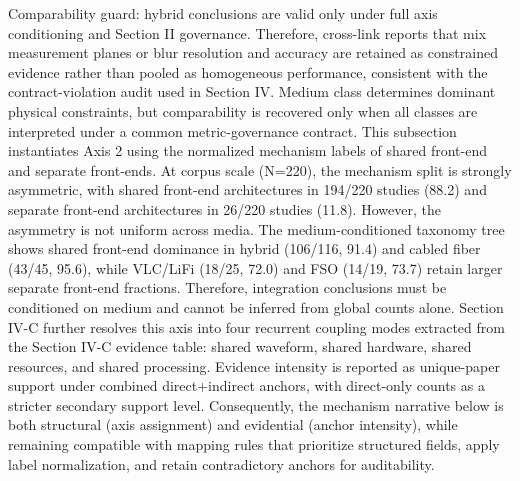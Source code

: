 {}Comparability guard: hybrid conclusions are valid only under full axis conditioning and Section II governance. Therefore, cross-link reports that mix measurement planes or blur resolution and accuracy are retained as constrained evidence rather than pooled as homogeneous performance, consistent with the contract-violation audit used in Section IV.\markdownRendererParagraphSeparator
{} Medium class determines dominant physical constraints, but comparability is recovered only when all classes are interpreted under a common metric-governance contract.\markdownRendererInterblockSeparator
{}\markdownRendererThematicBreak{}\markdownRendererInterblockSeparator
{}
\markdownRendererSectionEnd 
\markdownRendererSectionEnd \markdownRendererSectionBegin
{}\markdownRendererInterblockSeparator
{}This subsection instantiates Axis 2 using the normalized mechanism labels of shared front-end and separate front-ends. At corpus scale (N=220), the mechanism split is strongly asymmetric, with shared front-end architectures in 194/220 studies (88.2\markdownRendererPercentSign{}) and separate front-end architectures in 26/220 studies (11.8\markdownRendererPercentSign{}). However, the asymmetry is not uniform across media. The medium-conditioned taxonomy tree shows shared front-end dominance in hybrid (106/116, 91.4\markdownRendererPercentSign{}) and cabled fiber (43/45, 95.6\markdownRendererPercentSign{}), while VLC/LiFi (18/25, 72.0\markdownRendererPercentSign{}) and FSO (14/19, 73.7\markdownRendererPercentSign{}) retain larger separate front-end fractions. Therefore, integration conclusions must be conditioned on medium and cannot be inferred from global counts alone.\markdownRendererParagraphSeparator
{}Section IV-C further resolves this axis into four recurrent coupling modes extracted from the Section IV-C evidence table: shared waveform, shared hardware, shared resources, and shared processing. Evidence intensity is reported as unique-paper support under combined direct+indirect anchors, with direct-only counts as a stricter secondary support level. Consequently, the mechanism narrative below is both structural (axis assignment) and evidential (anchor intensity), while remaining compatible with mapping rules that prioritize structured fields, apply label normalization, and retain contradictory anchors for auditability.\markdownRendererParagraphSeparator
{}\markdownRendererInterblockSeparator
